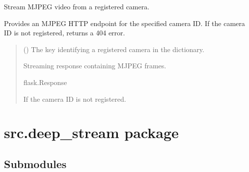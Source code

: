 \documentclass[letterpaper,10pt,english]{sphinxmanual}
\begin{document}
\begin{fulllineitems}
\label{\detokenize{modules/src.data_stream.StreamConversionServer:src.data_stream.StreamConversionServer.stream}}
\pysigstartsignatures
\pysiglinewithargsret
{}
{}
{}
\pysigstopsignatures
\sphinxAtStartPar
Stream MJPEG video from a registered camera.

\sphinxAtStartPar
Provides an MJPEG HTTP endpoint for the specified camera ID.
If the camera ID is not registered, returns a 404 error.
\begin{quote}\begin{description}
\sphinxAtStartPar
{} () \textendash{} The key identifying a registered camera in
the  dictionary.

\sphinxAtStartPar
Streaming response containing MJPEG frames.

\sphinxAtStartPar
flask.Response

\sphinxAtStartPar
{} \textendash{} If the camera ID is not registered.

\end{description}\end{quote}

\end{fulllineitems}


\sphinxstepscope


\section{src.deep\_stream package}
\label{\detokenize{modules/src.deep_stream:module-src.deep_stream}}\label{\detokenize{modules/src.deep_stream:src-deep-stream-package}}\label{\detokenize{modules/src.deep_stream::doc}}

\subsection{Submodules}
\label{\detokenize{modules/src.deep_stream:submodules}}
\sphinxstepscope
\end{document}
